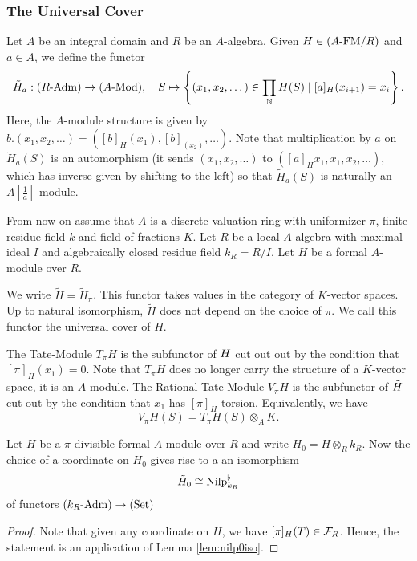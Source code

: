 \subsubsection{The Universal Cover} %
\label{ssub:The Universal Cover}
Let $A$ be an integral domain and $R$ be an $A$-algebra. Given $H \in {({A}\text-\mathrm{FM}/{R})}$ and $a \in A$,
we define the functor 
\begin{equation*}
  \Tilde H_a : {({R}\text-\mathrm{Adm})} \to {({A}\text-\mathrm{Mod})}, \quad
  S \mapsto \left\{(x_1, x_2, \dots) \in \prod_{\mathbb{N}} H(S) \mid [a]_H(x_{i+1}) =
  x_i \right\}.
\end{equation*}
Here, the $A$-module structure is given by $b.(x_1, x_2,\dots) = ([b]_H(x_1), [b]_(x_2),
\dots)$. Note that multiplication by $a$ on $\tilde H_a(S)$ is an automorphism
(it sends $(x_1, x_2, \dots)$ to $([a]_H x_1, x_1, x_2, \dots)$, which has inverse given
by shifting to the left)  so that $\tilde H_a(S)$ is naturally an
$A[\frac1a]$-module.

From now on assume that $A$ is a discrete valuation ring with uniformizer
$\pi$, finite residue field $k$ and field of fractions $K$. Let $R$ be 
a local $A$-algebra with maximal ideal $I$ and algebraically closed residue field 
$k_R = R/I$. Let $H$ be a formal $A$-module over $R$. 
\begin{defi}
  We write $\tilde H = \tilde H_\pi$. This functor
  takes values in the category of $K$-vector spaces.
  Up to natural isomorphism, $\tilde H$ does not depend on the choice of 
  $\pi$. We call this functor the universal cover of $H$. 

  The Tate-Module $T_\pi H$ is the subfunctor of $\Tilde H$ cut out out
  by the condition that $[\pi]_H(x_1) = 0$. Note that $T_\pi H$ does no longer 
  carry the structure of a $K$-vector space, it is an $A$-module. The Rational
  Tate Module $V_\pi H$ is the subfunctor of $\Tilde H$ cut out by the
  condition that $x_1$ has $[\pi]_H$-torsion. Equivalently, we have 
  \begin{equation*}
    V_\pi H (S) = T_\pi H(S) \otimes_A K.
  \end{equation*}
\end{defi}

\begin{lem}
  Let $H$ be a $\pi$-divisible formal $A$-module over $R$ and write $H_0 = H
  \otimes_R k_R$. Now the choice of a coordinate on $H_0$ gives rise to a
  an isomorphism 
  \begin{equation*}
    \tilde H_0 \cong {\mathrm{Nilp}}^\flat_{k_R}
  \end{equation*}
  of functors ${({k_R}\text-\mathrm{Adm})} \to {(\mathrm{Set})}$
  \begin{proof}
    Note that given any coordinate on $H$, we have $[\pi]_H(T) \in \mathcal{F}_R$. Hence,
    the statement is an application of Lemma \ref{lem:nilp0iso}.
  \end{proof}
\end{lem}

